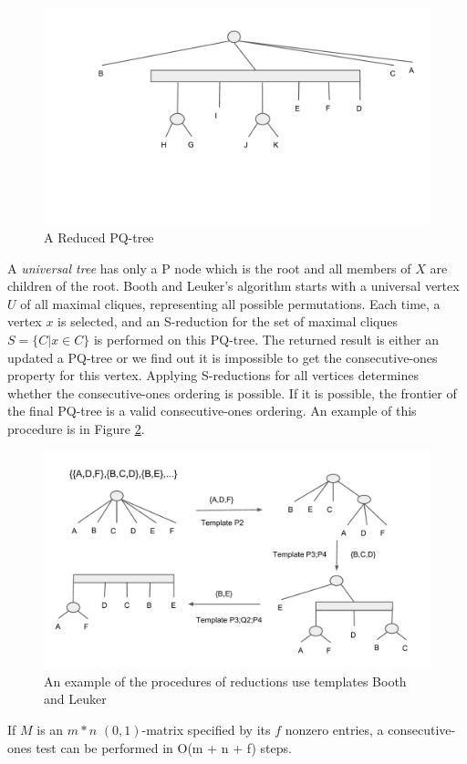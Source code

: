 \begin{figure}[H]
\centering
\includegraphics[width=12cm]{figures/pqtree_3.pdf}
\caption{A Reduced PQ-tree}
\label{pqtree_3}
\end{figure}

A \emph{universal tree} has only a P node which is the root and all members of $X$ are children of the root. Booth and Leuker's algorithm starts with a universal vertex $U$ of all maximal cliques, representing all possible permutations. Each time, a vertex $x$ is selected, and an S-reduction for the set of maximal cliques $S = \{C|x \in C\}$ is performed on this PQ-tree. The returned result is either an updated a PQ-tree or we find out it is impossible to get the consecutive-ones property for this vertex. Applying S-reductions for all vertices determines whether the consecutive-ones ordering is possible. If it is possible, the frontier of the final PQ-tree is a valid consecutive-ones ordering. An example of this procedure is in Figure \ref{pqtree_4}.

\begin{figure}[H]
\centering
\includegraphics[width=12cm]{figures/pqtree_4.pdf}
\caption{An example of the procedures of reductions use templates Booth and Leuker\cite{booth1976testing}}
\label{pqtree_4}
\end{figure}

\begin{theorem}
\cite{booth1976testing}
If $M$ is an $m*n$ $(0,1)$-matrix specified by its $f$ nonzero entries, a consecutive-ones test can be performed in O(m + n + f) steps.
\end{theorem}




	












